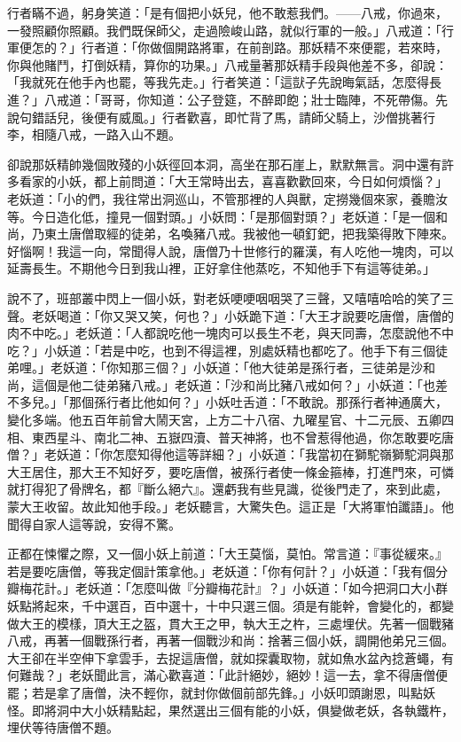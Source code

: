 行者瞞不過，躬身笑道：「是有個把小妖兒，他不敢惹我們。——八戒，你過來，一發照顧你照顧。我們既保師父，走過險峻山路，就似行軍的一般。」八戒道：「行軍便怎的？」行者道：「你做個開路將軍，在前剖路。那妖精不來便罷，若來時，你與他賭鬥，打倒妖精，算你的功果。」八戒量著那妖精手段與他差不多，卻說：「我就死在他手內也罷，等我先走。」行者笑道：「這獃子先說晦氣話，怎麼得長進？」八戒道：「哥哥，你知道：公子登筵，不醉即飽；壯士臨陣，不死帶傷。先說句錯話兒，後便有威風。」行者歡喜，即忙背了馬，請師父騎上，沙僧挑著行李，相隨八戒，一路入山不題。

卻說那妖精帥幾個敗殘的小妖徑回本洞，高坐在那石崖上，默默無言。洞中還有許多看家的小妖，都上前問道：「大王常時出去，喜喜歡歡回來，今日如何煩惱？」老妖道：「小的們，我往常出洞巡山，不管那裡的人與獸，定撈幾個來家，養贍汝等。今日造化低，撞見一個對頭。」小妖問：「是那個對頭？」老妖道：「是一個和尚，乃東土唐僧取經的徒弟，名喚豬八戒。我被他一頓釘鈀，把我築得敗下陣來。好惱啊！我這一向，常聞得人說，唐僧乃十世修行的羅漢，有人吃他一塊肉，可以延壽長生。不期他今日到我山裡，正好拿住他蒸吃，不知他手下有這等徒弟。」

說不了，班部叢中閃上一個小妖，對老妖哽哽咽咽哭了三聲，又嘻嘻哈哈的笑了三聲。老妖喝道：「你又哭又笑，何也？」小妖跪下道：「大王才說要吃唐僧，唐僧的肉不中吃。」老妖道：「人都說吃他一塊肉可以長生不老，與天同壽，怎麼說他不中吃？」小妖道：「若是中吃，也到不得這裡，別處妖精也都吃了。他手下有三個徒弟哩。」老妖道：「你知那三個？」小妖道：「他大徒弟是孫行者，三徒弟是沙和尚，這個是他二徒弟豬八戒。」老妖道：「沙和尚比豬八戒如何？」小妖道：「也差不多兒。」「那個孫行者比他如何？」小妖吐舌道：「不敢說。那孫行者神通廣大，變化多端。他五百年前曾大鬧天宮，上方二十八宿、九曜星官、十二元辰、五卿四相、東西星斗、南北二神、五嶽四瀆、普天神將，也不曾惹得他過，你怎敢要吃唐僧？」老妖道：「你怎麼知得他這等詳細？」小妖道：「我當初在獅駝嶺獅駝洞與那大王居住，那大王不知好歹，要吃唐僧，被孫行者使一條金箍棒，打進門來，可憐就打得犯了骨牌名，都『斷么絕六』。還虧我有些見識，從後門走了，來到此處，蒙大王收留。故此知他手段。」老妖聽言，大驚失色。這正是「大將軍怕讖語」。他聞得自家人這等說，安得不驚。

正都在悚懼之際，又一個小妖上前道：「大王莫惱，莫怕。常言道：『事從緩來。』若是要吃唐僧，等我定個計策拿他。」老妖道：「你有何計？」小妖道：「我有個分瓣梅花計。」老妖道：「怎麼叫做『分瓣梅花計』？」小妖道：「如今把洞口大小群妖點將起來，千中選百，百中選十，十中只選三個。須是有能幹，會變化的，都變做大王的模樣，頂大王之盔，貫大王之甲，執大王之杵，三處埋伏。先著一個戰豬八戒，再著一個戰孫行者，再著一個戰沙和尚：捨著三個小妖，調開他弟兄三個。大王卻在半空伸下拿雲手，去捉這唐僧，就如探囊取物，就如魚水盆內捻蒼蠅，有何難哉？」老妖聞此言，滿心歡喜道：「此計絕妙，絕妙！這一去，拿不得唐僧便罷；若是拿了唐僧，決不輕你，就封你做個前部先鋒。」小妖叩頭謝恩，叫點妖怪。即將洞中大小妖精點起，果然選出三個有能的小妖，俱變做老妖，各執鐵杵，埋伏等待唐僧不題。

